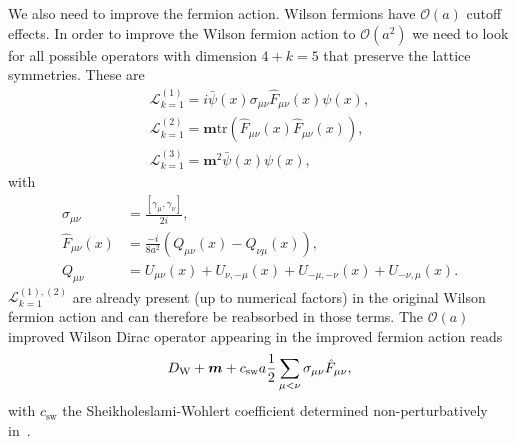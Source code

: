 We also need to improve the fermion action. Wilson fermions have $\mathcal{O}(a)$ cutoff effects. In order to improve the Wilson fermion action to $\mathcal{O}(a^2)$ we need to look for all possible operators with dimension $4+k=5$ that preserve the lattice symmetries. These are
\begin{gather}
\label{ch_foundation:eq:L1}
\mathcal{L}_{k=1}^{(1)}=i\bar{\psi}(x)\sigma_{\mu\nu}\hat{F}_{\mu\nu}(x)\psi(x),\\
\mathcal{L}_{k=1}^{(2)}=\boldsymbol{m}{\textrm{tr}}\left(\hat{F}_{\mu\nu}(x)\hat{F}_{\mu\nu}(x)\right),\\
\mathcal{L}_{k=1}^{(3)}=\boldsymbol{m}^2\bar{\psi}(x)\psi(x),
\end{gather}
with
\begin{align}
\label{ch_foundation:eq:dim5-op}
\sigma_{\mu\nu}&=\frac{\left[\gamma_{\mu},\gamma_{\nu}\right]}{2i},\\
\hat{F}_{\mu\nu}(x)&=\frac{-i}{8a^2}\left(Q_{\mu\nu}(x)-Q_{\nu\mu}(x)\right),\\
Q_{\mu\nu}&=U_{\mu\nu}(x)+U_{\nu,-\mu}(x)+U_{-\mu,-\nu}(x)+U_{-\nu,\mu}(x).
\end{align}
$\mathcal{L}_{k=1}^{(1),(2)}$ are already present (up to numerical factors) in the original Wilson fermion action and can therefore be reabsorbed in those terms. The $\mathcal{O}(a)$ improved Wilson Dirac operator appearing in the improved fermion action reads
\begin{equation}
\label{ch_foundation:eq:DW_impr}
D_{\textrm W}+\boldsymbol{m}+c_{\textrm{sw}}a\frac{1}{2}\sum_{\mu<\nu}\sigma_{\mu\nu}\hat{F}_{\mu\nu},
\end{equation}
with $c_{\textrm{sw}}$ the Sheikholeslami-Wohlert coefficient determined non-perturbatively in~\citep{Sheikholeslami:1985ij}.

